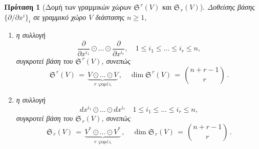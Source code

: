 \documentclass[11pt,a4paper,twoside,openright]{book}
\newtheorem{proposition}[lemma]{Πρόταση}
\begin{document}
\begin{proposition}[Δομή των γραμμικών χώρων $\mathfrak{S}^{\,r}(V)$ και $\mathfrak{S}_{\,r}(V)$]
	\label{prop:symmetric-tensor-space-structure}
Δοθείσης βάσης $\{\partial/\partial x^i\}_i$ σε γραμμικό χώρο $V$ διάστασης $n \ge 1$,

\begin{enumerate}[label=(\roman*), leftmargin=0pt, itemindent=*, align=left]
    \item[\textup{(i)}]
    	η συλλογή
\begin{equation}\label{eq:symmetric-contravariant-space-base}
\frac{\partial}{\partial x^{i_1}} \odot \dots \odot \frac{\partial}{\partial x^{i_r}},
\quad
1 \le i_1 \le \dots \le i_r \le n,
\end{equation}
συγκροτεί βάση του $\mathfrak{S}^{\,r}(V)$, συνεπώς
\begin{equation}\label{eq:symmetric-contravariant-space-canonical-isomorphism}
\mathfrak{S}^{\,r}(V)
\,=\,
\underbrace{V \odot \dots \odot V}_{r \text{ φορές}}\,,
\quad
\operatorname{dim} \mathfrak{S}^{\,r}(V)
\,=\,
\binom{n+r-1}{r}\,.
\end{equation}
    \item[\textup{(ii)}]
    	η συλλογή
\begin{equation}\label{eq:symmetric-covariant-space-base}
dx^{i_1} \odot \dots \odot dx^{i_r}
\quad
1 \le i_1 \le \dots \le i_r \le n,
\end{equation}
συγκροτεί βάση του $\mathfrak{S}_{\,r}(V)$, συνεπώς
\begin{equation}\label{eq:symmetric-covariant-space-canonical-isomorphism}
\mathfrak{S}_{\,r}(V)
\,=\,
\underbrace{V^* \odot \dots \odot V^*}_{r \text{ φορές}}\,,
\quad
\operatorname{dim} \mathfrak{S}_{\,r}(V)
\,=\,
\binom{n+r-1}{r}\,.
\end{equation}
\end{enumerate}
\end{proposition}
\end{document}
